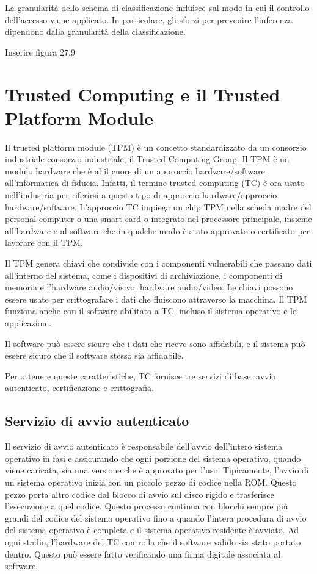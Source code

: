 La granularità dello schema di classificazione influisce sul modo in cui il controllo dell'accesso viene applicato. In particolare, gli sforzi per prevenire l'inferenza dipendono dalla granularità della classificazione.

Inserire figura 27.9

\section{Trusted Computing e il Trusted Platform Module}

Il trusted platform module (TPM) è un concetto standardizzato da un consorzio industriale consorzio industriale, il Trusted Computing Group. Il TPM è un modulo hardware che è al il cuore di un approccio hardware/software all'informatica di fiducia. Infatti, il termine trusted computing (TC) è ora usato nell'industria per riferirsi a questo tipo di approccio hardware/approccio hardware/software. L'approccio TC impiega un chip TPM nella scheda madre del personal computer o una smart card o integrato nel processore principale, insieme all'hardware e al software che in qualche modo è stato approvato o certificato per lavorare con il TPM.

\singlespacing

Il TPM genera chiavi che condivide con i componenti vulnerabili che passano dati all'interno del sistema, come i dispositivi di archiviazione, i componenti di memoria e l'hardware audio/visivo. hardware audio/video. Le chiavi possono essere usate per crittografare i dati che fluiscono attraverso la macchina. Il TPM funziona anche con il software abilitato a TC, incluso il sistema operativo e le applicazioni.

\singlespacing

Il software può essere sicuro che i dati che riceve sono affidabili, e il sistema può essere sicuro che il software stesso sia affidabile.

\singlespacing

Per ottenere queste caratteristiche, TC fornisce tre servizi di base: avvio autenticato, certificazione e crittografia.

\newpage
\subsection{Servizio di avvio autenticato}
Il servizio di avvio autenticato è responsabile dell'avvio dell'intero sistema operativo in fasi e assicurando che ogni porzione del sistema operativo, quando viene caricata, sia una versione che è approvato per l'uso. Tipicamente, l'avvio di un sistema operativo inizia con un piccolo pezzo di codice nella ROM. Questo pezzo porta altro codice dal blocco di avvio sul disco rigido e trasferisce l'esecuzione a quel codice. Questo processo continua con blocchi sempre più grandi del codice del sistema operativo fino a quando l'intera procedura di avvio del sistema operativo è completa e il sistema operativo residente è avviato. Ad ogni stadio, l'hardware del TC controlla che il software valido sia stato portato dentro. Questo può essere fatto verificando una firma digitale associata al software.

